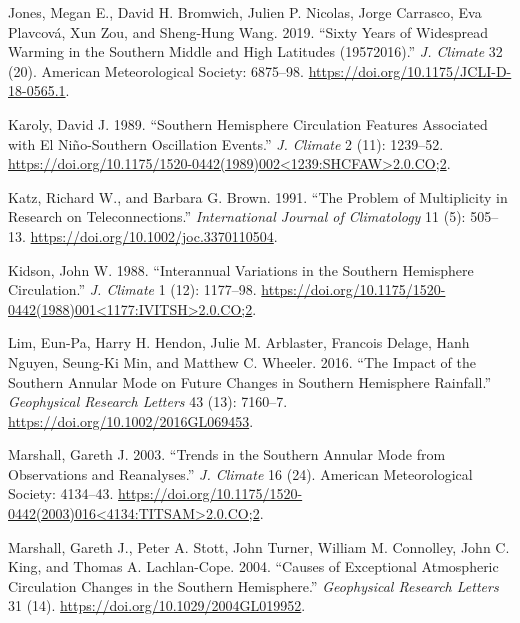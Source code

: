 \documentclass[smallextended]{svjour3}       %
\begin{document}
\leavevmode\hypertarget{ref-jones2019}{}%
Jones, Megan E., David H. Bromwich, Julien P. Nicolas, Jorge Carrasco, Eva Plavcová, Xun Zou, and Sheng-Hung Wang. 2019. ``Sixty Years of Widespread Warming in the Southern Middle and High Latitudes (19572016).'' \emph{J. Climate} 32 (20). American Meteorological Society: 6875--98. \url{https://doi.org/10.1175/JCLI-D-18-0565.1}.

\leavevmode\hypertarget{ref-karoly1989}{}%
Karoly, David J. 1989. ``Southern Hemisphere Circulation Features Associated with El Niño-Southern Oscillation Events.'' \emph{J. Climate} 2 (11): 1239--52. \href{https://doi.org/10.1175/1520-0442(1989)002\%3C1239:SHCFAW\%3E2.0.CO;2}{https://doi.org/10.1175/1520-0442(1989)002\textless{}1239:SHCFAW\textgreater{}2.0.CO;2}.

\leavevmode\hypertarget{ref-katz1991}{}%
Katz, Richard W., and Barbara G. Brown. 1991. ``The Problem of Multiplicity in Research on Teleconnections.'' \emph{International Journal of Climatology} 11 (5): 505--13. \url{https://doi.org/10.1002/joc.3370110504}.

\leavevmode\hypertarget{ref-kidson1988}{}%
Kidson, John W. 1988. ``Interannual Variations in the Southern Hemisphere Circulation.'' \emph{J. Climate} 1 (12): 1177--98. \href{https://doi.org/10.1175/1520-0442(1988)001\%3C1177:IVITSH\%3E2.0.CO;2}{https://doi.org/10.1175/1520-0442(1988)001\textless{}1177:IVITSH\textgreater{}2.0.CO;2}.

\leavevmode\hypertarget{ref-lim2016}{}%
Lim, Eun-Pa, Harry H. Hendon, Julie M. Arblaster, Francois Delage, Hanh Nguyen, Seung-Ki Min, and Matthew C. Wheeler. 2016. ``The Impact of the Southern Annular Mode on Future Changes in Southern Hemisphere Rainfall.'' \emph{Geophysical Research Letters} 43 (13): 7160--7. \url{https://doi.org/10.1002/2016GL069453}.

\leavevmode\hypertarget{ref-marshall2003}{}%
Marshall, Gareth J. 2003. ``Trends in the Southern Annular Mode from Observations and Reanalyses.'' \emph{J. Climate} 16 (24). American Meteorological Society: 4134--43. \href{https://doi.org/10.1175/1520-0442(2003)016\%3C4134:TITSAM\%3E2.0.CO;2}{https://doi.org/10.1175/1520-0442(2003)016\textless{}4134:TITSAM\textgreater{}2.0.CO;2}.

\leavevmode\hypertarget{ref-marshall2004}{}%
Marshall, Gareth J., Peter A. Stott, John Turner, William M. Connolley, John C. King, and Thomas A. Lachlan-Cope. 2004. ``Causes of Exceptional Atmospheric Circulation Changes in the Southern Hemisphere.'' \emph{Geophysical Research Letters} 31 (14). \url{https://doi.org/10.1029/2004GL019952}.
\end{document}
